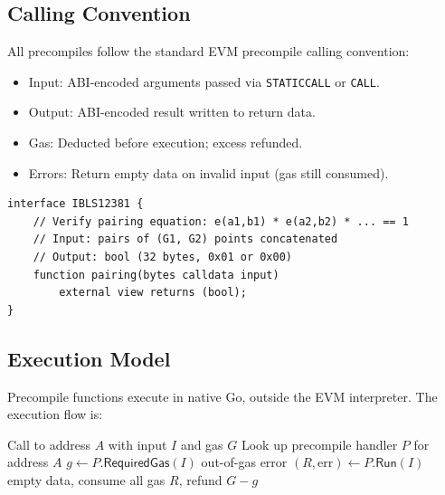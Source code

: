 \subsection{Calling Convention}

All precompiles follow the standard EVM precompile calling convention:
\begin{itemize}
    \item Input: ABI-encoded arguments passed via \texttt{STATICCALL} or \texttt{CALL}.
    \item Output: ABI-encoded result written to return data.
    \item Gas: Deducted before execution; excess refunded.
    \item Errors: Return empty data on invalid input (gas still consumed).
\end{itemize}

\begin{lstlisting}[language=Solidity,caption={Solidity interface for BLS12-381 pairing precompile.},label={lst:interface}]
interface IBLS12381 {
    // Verify pairing equation: e(a1,b1) * e(a2,b2) * ... == 1
    // Input: pairs of (G1, G2) points concatenated
    // Output: bool (32 bytes, 0x01 or 0x00)
    function pairing(bytes calldata input)
        external view returns (bool);
}
\end{lstlisting}

\subsection{Execution Model}

Precompile functions execute in native Go, outside the EVM interpreter. The execution flow is:

\begin{algorithm}[H]
\caption{Precompile Dispatch}
\label{alg:dispatch}
\begin{algorithmic}[1]
\Require Call to address $A$ with input $I$ and gas $G$
\State Look up precompile handler $P$ for address $A$
\State $g \gets P.\mathsf{RequiredGas}(I)$ 
    \State \Return out-of-gas error
\EndIf
\State $(R, \text{err}) \gets P.\mathsf{Run}(I)$ 
    \State \Return empty data, consume all gas
\EndIf
\State \Return $R$, refund $G - g$
\end{algorithmic}
\end{algorithm}

